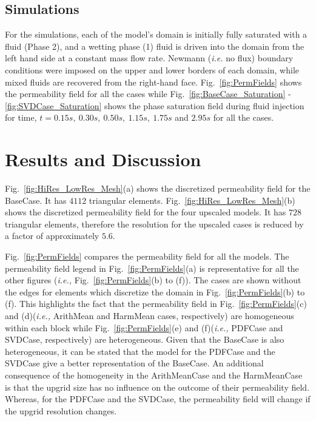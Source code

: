 \documentclass[preprint,12pt]{elsarticle}
\newcommand{\ie}{{\it i.e., }}
\begin{document}
\subsection{Simulations}\label{subsection:simulations}
For the simulations, each of the model's domain is initially fully saturated with a fluid (Phase 2), and a wetting phase (1) fluid is driven into the domain from the left hand side at a constant mass flow rate. Newmann ({\it i.e.} no flux) boundary conditions were imposed on the upper and lower borders of each domain, while mixed fluids are recovered from the right-hand face. Fig.~\ref{fig:PermFields} shows the permeability field for all the cases while Fig.~\ref{fig:BaseCase_Saturation} - \ref{fig:SVDCase_Saturation} shows the phase saturation field during fluid injection for time, $t = 0.15s,~0.30s,~0.50s,~1.15s,~1.75s$ and $2.95s$ for all the cases.

\section{Results and Discussion}\label{section:results_discussion}

Fig.~\ref{fig:HiRes_LowRes_Mesh}(a) shows the discretized permeability field for the BaseCase. It has $4112$ triangular elements. Fig.~\ref{fig:HiRes_LowRes_Mesh}(b) shows the discretized permeability field for the four upscaled models. It has $728$ triangular elements, therefore the resolution for the upscaled cases is reduced by a factor of approximately $5.6$.

Fig.~\ref{fig:PermFields} compares the permeability field for all the models. The permeability field legend in Fig.~\ref{fig:PermFields}(a) is representative for all the other figures (\ie Fig.~\ref{fig:PermFields}(b) to (f)). The cases are shown without the edges for elements which discretize the domain in Fig.~\ref{fig:PermFields}(b) to (f). This highlights the fact that the permeability field in  Fig.~\ref{fig:PermFields}(c) and (d)(\ie ArithMean and HarmMean cases, respectively) are homogeneous within each block while Fig.~\ref{fig:PermFields}(e) and (f)(\ie PDFCase and SVDCase, respectively) are heterogeneous. Given that the BaseCase is also heterogeneous, it can be stated that the model for the PDFCase and the SVDCase give a better representation of the BaseCase. An additional consequence of the homogeneity in the ArithMeanCase and the HarmMeanCase is that the upgrid size has no influence on the outcome of their permeability field. Whereas, for the PDFCase and the SVDCase, the permeability field will change if the upgrid resolution changes.
\end{document}
